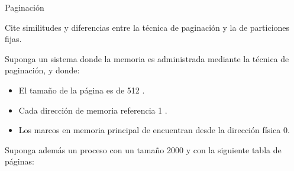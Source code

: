 \begin{questions}
\question Paginación

\question Cite similitudes y diferencias entre la técnica de paginación y la de particiones fijas.

\question Suponga un sistema donde la memoria es administrada mediante la técnica de paginación, y donde:
\begin{itemize}
	\item El tamaño de la página es de 512 \bytes.
	\item Cada dirección de memoria referencia 1 \byte.
	\item Los marcos en memoria principal de encuentran desde la dirección física 0.
\end{itemize}	

Suponga además un proceso con un tamaño 2000 \bytes y con la siguiente tabla de páginas:
\begin{table}[h]
  \centering
\end{table}
\begin{parts}

\end{parts}
\end{questions}
